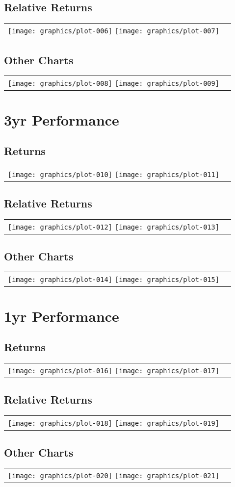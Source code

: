 \documentclass{article}
\begin{document}
\subsection{Relative Returns}
\begin{tabular}{cc}
\texttt{[image: graphics/plot-006]}
\texttt{[image: graphics/plot-007]}
\end{tabular}
\subsection{Other Charts}
\begin{tabular}{cc}
\texttt{[image: graphics/plot-008]}
\texttt{[image: graphics/plot-009]}
\end{tabular}
\section{3yr Performance}
\subsection{Returns}
\begin{tabular}{cc}
\texttt{[image: graphics/plot-010]}
\texttt{[image: graphics/plot-011]}
\end{tabular}
\subsection{Relative Returns}
\begin{tabular}{cc}
\texttt{[image: graphics/plot-012]}
\texttt{[image: graphics/plot-013]}
\end{tabular}
\subsection{Other Charts}
\begin{tabular}{cc}
\texttt{[image: graphics/plot-014]}
\texttt{[image: graphics/plot-015]}
\end{tabular}
\section{1yr Performance}
\subsection{Returns}
\begin{tabular}{cc}
\texttt{[image: graphics/plot-016]}
\texttt{[image: graphics/plot-017]}
\end{tabular}
\subsection{Relative Returns}
\begin{tabular}{cc}
\texttt{[image: graphics/plot-018]}
\texttt{[image: graphics/plot-019]}
\end{tabular}
\subsection{Other Charts}
\begin{tabular}{cc}
\texttt{[image: graphics/plot-020]}
\texttt{[image: graphics/plot-021]}
\end{tabular}
\end{document}
